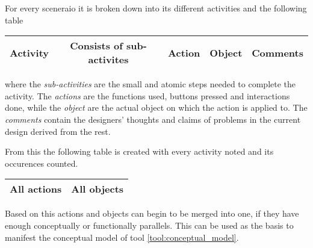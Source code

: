 \begin{method} \label{meth:object-action_analysis} 
  For every sceneraio it is broken down into its different activities and the following table
  \begin{center}
    \begin{tabular}{c|c|c|c|c}
      \hline
      Activity & Consists of sub-activites & Action & Object & Comments
      \\ \hline
    \end{tabular}
  \end{center}
  where the \emph{sub-activities} are the small and atomic steps needed to complete the activity. The \emph{actions} are the functions used, buttons pressed and interactions done, while the \emph{object} are the actual object on which the action is applied to. The \emph{comments} contain the designers' thoughts and claims of problems in the current design derived from the rest.

  From this the following table is created with every activity noted and its occurences counted.
  \begin{center}
    \begin{tabular}{c|c}
      \hline
      All actions & All objects
      \\ \hline
    \end{tabular}
  \end{center}
  Based on this actions and objects can begin to be merged into one, if they have enough conceptually or functionally parallels. This can be used as the basis to manifest the conceptual model of tool \ref{tool:conceptual_model}. \cite[p 198]{benyon14}
\end{method}